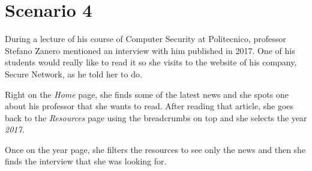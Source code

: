 \documentclass[12pt]{report}
\begin{document}
\clearpage
\section{Scenario 4}
During a lecture of his course of Computer Security at Politecnico, professor Stefano Zanero mentioned an interview with him published in 2017.
One of his students would really like to read it so she visits to the website of his company, Secure Network, as he told her to do.

Right on the \emph{Home} page, she finds some of the latest news and she spots one about his professor that she wants to read.
After reading that article, she goes back to the \emph{Resources} page using the breadcrumbs on top and she selects the year \emph{2017}.

Once on the year page, she filters the resources to see only the news and then she finds the interview that she was looking for.
\end{document}
